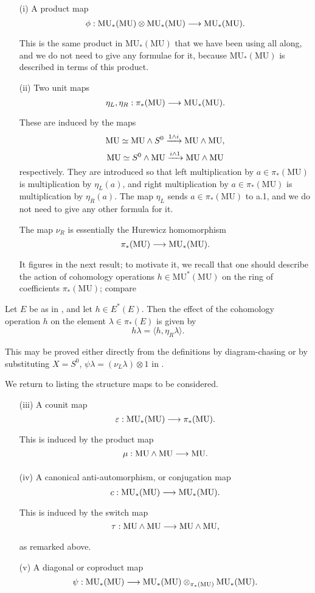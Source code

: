 \documentclass[../main]{subfiles}
\begin{document}
\begin{enumerate}
    \item[(i)] A product map \[\phi : \mathrm{MU}_\ast(\mathrm{MU}) \otimes \mathrm{MU}_\ast(\mathrm{MU}) \lar{} \mathrm{MU}_\ast(\mathrm{MU}).\] This is the same product in $\mathrm{MU}_\ast(\mathrm{MU})$ that we have been using all along, and we do not need to give any formulae for it, because $\mathrm{MU}_\ast(\mathrm{MU})$ is described in terms of this product.
    \item[(ii)] Two unit maps \[\eta_L, \eta_R : \pi_\ast(\mathrm{MU}) \lar{} \mathrm{MU}_\ast(\mathrm{MU}).\] These are induced by the maps 
    \[\mathrm{MU} \simeq \mathrm{MU} \wedge S^0 \lar{1 \wedge i} \mathrm{MU} \wedge \mathrm{MU},\]
    \[\mathrm{MU} \simeq S^0 \wedge \mathrm{MU} \lar{i \wedge 1} \mathrm{MU} \wedge \mathrm{MU}\]
    respectively. They are introduced so that left multiplication by $a \in \pi_\ast(\mathrm{MU})$ is multiplication by $\eta_L(a)$, and right multiplication by $a \in \pi_\ast(\mathrm{MU})$ is multiplication by $\eta_R(a)$. The map $\eta_L$ sends $a \in \pi_\ast(\mathrm{MU})$ to a.1, and we do not need to give any other formula for it.

    The map $\nu_R$ is essentially the Hurewicz homomorphism \[\pi_\ast(\mathrm{MU}) \lar{} \mathrm{MU}_\ast(\mathrm{MU}).\] It figures in the next result; to motivate it, we recall that one should describe the action of cohomology operations $h \in \mathrm{MU}^\ast(\mathrm{MU})$ on the ring of coefficients $\pi_\ast(\mathrm{MU})$; compare \cite[p.~19; Theorem 8.1, p.~23]{adams2}
\end{enumerate}

\begin{proposition}
\label{prop:p2c11.2}
Let $E$ be as in \cite[Lecture 3]{adams3}, and let $h \in E^\ast(E)$. Then the effect of the cohomology operation $h$ on the element $\lambda \in \pi_\ast(E)$ is given by \[h \lambda = \langle h, \eta_R \lambda\rangle.\]
\end{proposition}

This may be proved either directly from the definitions by diagram-chasing or by substituting $X = S^0$, $\psi \lambda = (\nu_L \lambda) \otimes 1$ in \cite[Proposition 2, p.~75]{adams3}.

We return to listing the structure maps to be considered.

\begin{enumerate}
    \item[(iii)] A counit map \[\varepsilon : \mathrm{MU}_\ast(\mathrm{MU}) \lar{} \pi_\ast(\mathrm{MU}).\] This is induced by the product map \[\mu : \mathrm{MU} \wedge \mathrm{MU} \lar{} \mathrm{MU}.\]
    \item[(iv)] A canonical anti-automorphism, or conjugation map \[c : \mathrm{MU}_\ast(\mathrm{MU}) \lar{} \mathrm{MU}_\ast(\mathrm{MU}).\] This is induced by the switch map \[\tau : \mathrm{MU} \wedge \mathrm{MU} \lar{} \mathrm{MU} \wedge \mathrm{MU},\] as remarked above. 
    \item[(v)] A diagonal or coproduct map \[\psi : \mathrm{MU}_\ast(\mathrm{MU}) \lar{} \mathrm{MU}_\ast (\mathrm{MU}) \otimes_{\pi_\ast(\mathrm{MU})} \mathrm{MU}_\ast(\mathrm{MU}).\]
\end{enumerate}
\end{document}
